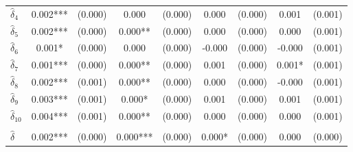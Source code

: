 {\begin{tabular}{l*{4}{cc}}
$\hat{\delta}_4$&       0.002***&     (0.000)&       0.000   &     (0.000)&       0.000   &     (0.000)&       0.001   &     (0.001)\\
$\hat{\delta}_5$&       0.002***&     (0.000)&       0.000** &     (0.000)&       0.000   &     (0.000)&       0.000   &     (0.001)\\
$\hat{\delta}_6$&       0.001*  &     (0.000)&       0.000   &     (0.000)&      -0.000   &     (0.000)&      -0.000   &     (0.001)\\
$\hat{\delta}_7$&       0.001***&     (0.000)&       0.000** &     (0.000)&       0.001   &     (0.000)&       0.001*  &     (0.001)\\
$\hat{\delta}_8$&       0.002***&     (0.001)&       0.000** &     (0.000)&       0.000   &     (0.000)&      -0.000   &     (0.001)\\
$\hat{\delta}_9$&       0.003***&     (0.001)&       0.000*  &     (0.000)&       0.001   &     (0.000)&       0.001   &     (0.001)\\
$\hat{\delta}_{10}$&       0.004***&     (0.001)&       0.000** &     (0.000)&       0.000   &     (0.000)&       0.000   &     (0.001)\\
\addlinespace&               &            &               &            &               &            &               &            \\
$\hat{\delta}$&       0.002***&     (0.000)&       0.000***&     (0.000)&       0.000*  &     (0.000)&       0.000   &     (0.000)\\
\bottomrule
\end{tabular}
}
